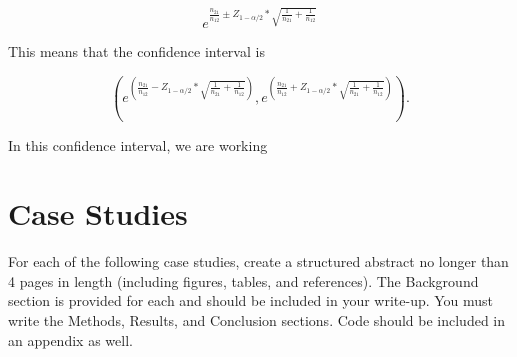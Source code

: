 \documentclass{article}
\begin{document}
	$$e^{\frac{n_{21}}{n_{12}} \pm Z_{1 - \alpha/2} * \sqrt{\frac{1}{n_{21}} + \frac{1}{n_{12}}}}$$

	This means that the confidence interval is

	$$\left(e^{\left(\frac{n_{21}}{n_{12}} - Z_{1 - \alpha/2} * \sqrt{\frac{1}{n_{21}} + \frac{1}{n_{12}}} \right)} , 
	e^{\left(\frac{n_{21}}{n_{12}} + Z_{1 - \alpha/2} * \sqrt{\frac{1}{n_{21}} + \frac{1}{n_{12}}} \right)}\right). $$ 

	In this confidence interval, we are working 


	\section*{Case Studies}
	For each of the following case studies, create a structured abstract no longer than 4 pages in length (including figures, tables, and references). The Background section is provided for each and should be included in your write-up. You must write the Methods, Results, and Conclusion sections. Code should be included in an appendix as well.
\end{document}
